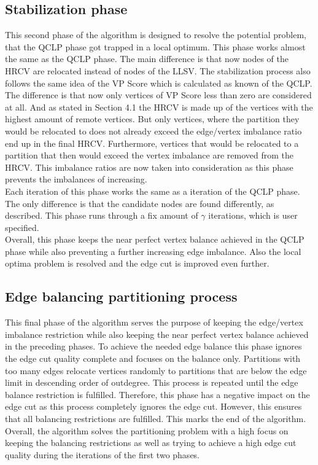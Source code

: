 \documentclass[acmsmall,nonacm,screen,review]{acmart}
\begin{document}
\subsection{Stabilization phase}
This second phase of the algorithm is designed to resolve the potential problem, that the QCLP phase got trapped in a local optimum. This phase works almost the same as the QCLP phase. The main difference is that now nodes of the HRCV are relocated instead of nodes of the LLSV. The stabilization process also follows the same idea of the VP Score which is calculated as known of the QCLP. The difference is that now only vertices of VP Score less than zero are considered at all. And as stated in Section 4.1 the HRCV is made up of the vertices with the highest amount of remote vertices. But only vertices, where the partition they would be relocated to does not already exceed the edge/vertex imbalance ratio end up in the final HRCV. Furthermore, vertices that would be relocated to a partition that then would exceed the vertex imbalance are removed from the HRCV. This imbalance ratios are now taken into consideration as this phase prevents the imbalances of increasing. \\
Each iteration of this phase works the same as a iteration of the QCLP phase. The only difference is that the candidate nodes are found differently, as described. This phase runs through a fix amount of $\gamma$ iterations, which is user specified.\\
Overall, this phase keeps the near perfect vertex balance achieved in the QCLP phase while also preventing a further increasing edge imbalance. Also the local optima problem is resolved and the edge cut is improved even further.
\subsection{Edge balancing partitioning process}
This final phase of the algorithm serves the purpose of keeping the edge/vertex imbalance restriction while also keeping the near perfect vertex balance achieved in the preceding phases. To achieve the needed edge balance this phase ignores the edge cut quality complete and focuses on the balance only. Partitions with too many edges relocate vertices randomly to partitions that are below the edge limit in descending order of outdegree. This process is repeated until the edge balance restriction is fulfilled. Therefore, this phase has a negative impact on the edge cut as this process completely ignores the edge cut. However, this ensures that all balancing restrictions are fulfilled. This marks the end of the algorithm. Overall, the algorithm solves the partitioning problem with a high focus on keeping the balancing restrictions as well as trying to achieve a high edge cut quality during the iterations of the first two phases.
\end{document}
